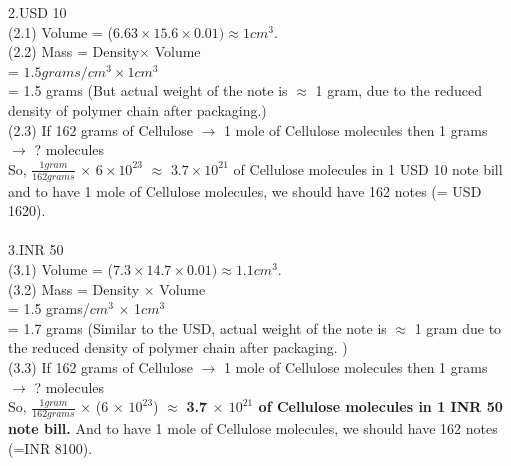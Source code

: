 \documentclass[11pt]{exam}
\begin{document}
\begin{questions}
{\begin{minipage}{42em}
                                         
                                         
2.USD 10 \\ 

(2.1) Volume = ($6.63 \times 15.6 \times 0.01) \approx 1cm^{3}$.\\ 

(2.2) Mass    = Density$\times$ Volume \\
	             = $1.5 grams/cm^{3}\times 1cm^{3}$ \\
                     = 1.5 grams  (But actual weight of the note is $\approx$ 1 gram, due to the reduced density of polymer chain after packaging.)\\ 
                      
 (2.3) If 162 grams of Cellulose $\rightarrow$ 1 mole of Cellulose molecules then 1 grams $\rightarrow$ ? molecules\\ 
                     
So, {$\frac{1 gram} {162 grams}$} $\times$  $6\times10^{23}$  $\approx$   \textbf{$3.7\times10^{21}$} of Cellulose molecules in 1 USD 10 note bill  and to have 1 mole of Cellulose molecules, we should have 162 notes (= USD 1620). \\ \\

3.INR 50 \\ 
(3.1) Volume = ($7.3 \times 14.7\times 0.01) \approx 1.1cm^{3}$.\\       
(3.2) Mass    = Density $\times$ Volume \\
                     = 1.5 grams/$cm^{3}$ $\times$ 1$cm^{3}$ \\
                     = 1.7 grams  (Similar to the USD, actual weight of the note is $\approx$ 1 gram due to the reduced density of polymer chain after packaging. )\\   
                     
(3.3) If 162 grams of Cellulose $\rightarrow$ 1 mole of Cellulose molecules then 1 grams $\rightarrow$ ? molecules\\ 

 So, $\frac{ 1 gram }{162 grams}$ $\times$ (6 $\times$ $10^{23}$) $\approx$ \textbf{3.7 $\times$ $10^{21}$ of Cellulose molecules in 1 INR 50 note bill.} And to have 1 mole of Cellulose molecules, we should have 162 notes (=INR 8100). \\ \\  

\end{minipage}}\\   \\ \\ \\ \\ \\               


\end{questions}
\end{document}
